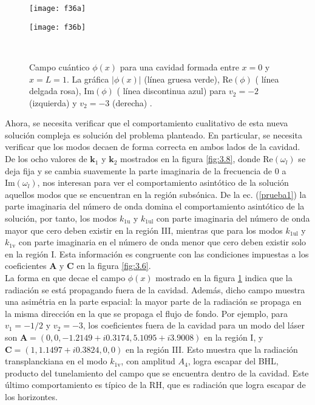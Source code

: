 \begin{center}
\begin{figure}[h]
\begin{minipage}[c]{0.5\textwidth}
\texttt{[image: f36a]}
  \end{minipage}%
\begin{minipage}[c]{0.5\textwidth}
\texttt{[image: f36b]}
\end{minipage}\\[20pt]                 
\caption{Campo cuántico $\phi(x)$ para una cavidad formada entre $x=0$ y $x=L=1$. La gr\'{a}fica $|\phi(x)|$ (l\'{i}nea gruesa verde), $\text{Re}(\phi)$ ( l\'{i}nea delgada rosa), $\text{Im}(\phi)$ ( l\'{i}nea discontinua azul) para $v_2=-2$ (izquierda) y $v_2 = -3$ (derecha) \citep{2018Bermudez}.}\label{fig:3.7}   
\end{figure}
\end{center}

Ahora, se necesita verificar que el comportamiento cualitativo de esta nueva solución compleja es soluci\'{o}n del problema planteado. En particular, se necesita verificar que los modos decaen de forma correcta en ambos lados de la cavidad. De los ocho valores de $\textbf{k}_1$ y $\textbf{k}_2$ mostrados en la figura \ref{fig:3.8}, donde  $\text{Re}(\omega_l)$ se deja fija y se cambia suavemente la parte imaginaria de la frecuencia de $0$ a $\text{Im}(\omega_l)$, nos interesan para ver el comportamiento asint\'{o}tico de la soluci\'{o}n aquellos modos que se encuentran en la regi\'{o}n subs\'{o}nica. De la ec. (\ref{prueba1}) la parte imaginaria del n\'{u}mero de onda domina el comportamiento asint\'{o}tico de la soluci\'{o}n, por tanto, los modos $k_{\text{1u}}$ y $k_{\text{1ul}}$ con parte imaginaria del n\'{u}mero de onda mayor que cero deben existir en la regi\'{o}n III, mientras que para los modos $k_{\text{1ul}}$ y $k_{\text{1v}}$ con parte  imaginaria en el n\'{u}mero de onda menor que cero deben existir solo en la regi\'{o}n I. Esta informaci\'{o}n es congruente con las condiciones impuestas a los coeficientes \textbf{A} y \textbf{C} en la figura \ref{fig:3.6}.\\

La forma en que decae el campo $\phi(x)$ mostrado en la figura \ref{fig:3.7} indica que la radiaci\'{o}n se est\'a propagando fuera de la cavidad.  Adem\'{a}s, dicho campo muestra una asim\'{e}tria  en la parte espacial: la mayor parte de la radiaci\'{o}n se propaga en la misma direcci\'{o}n en la que se propaga el flujo de fondo. Por ejemplo, para $v_1=-1/2$ y $v_2=-3$, los coeficientes fuera de la cavidad para un modo del l\'{a}ser son $\textbf{A}=(0,0,-1.2149+i0.3174,5.1095+i3.9008)$ en la regi\'{o}n I, y $\textbf{C}=(1,1.1497+i0.3824,0,0)$ en la regi\'{o}n III. Esto muestra que la radiación transplanckiana en el modo $k_{\text{1v}}$, con amplitud $A_4$, logra escapar del BHL, producto del tunelamiento del campo que se encuentra dentro de la cavidad. Este \'{u}ltimo comportamiento es t\'ipico de la RH, que es  radiaci\'{o}n que logra escapar de los horizontes.\\
 
